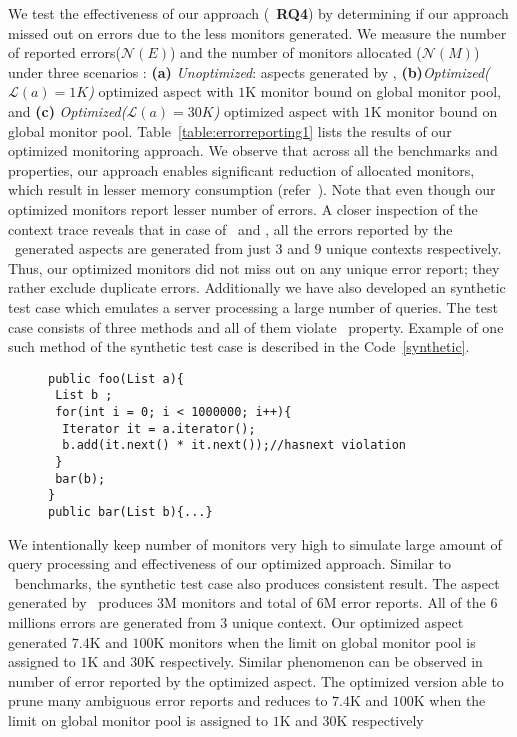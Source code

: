 We test the effectiveness of our approach (\ie\ \textbf{RQ4}) by determining 
if our approach missed out on errors due to the less monitors generated. We 
measure the number of reported errors($\mathcal{N}(E)$) and the number of 
monitors allocated ($\mathcal{N}(M)$) under three scenarios : \textbf{(a)}
\emph{Unoptimized}: aspects generated by \javamop, 
\textbf{(b)}\emph{Optimized($\mathcal{L}(a) = 1K$)} optimized aspect with $1$K 
monitor bound on global monitor pool, and \textbf{(c)} 
\emph{Optimized($\mathcal{L}(a) = 30K$)} optimized aspect with $1$K monitor
bound on global monitor pool. Table~\ref{table:errorreporting1} lists the 
results of our optimized monitoring approach. We observe that across all the 
benchmarks and properties, our approach enables significant reduction of 
allocated monitors, which result in lesser memory consumption 
(refer~). Note that even though our optimized 
monitors report lesser number of errors. A closer inspection of the context 
trace reveals that in case of \bloat\ and \avrora, all the errors
reported by the \javamop\ generated aspects are generated from just $3$ and $9$ 
unique contexts respectively. Thus, our optimized monitors did not miss out on 
any unique error report; they rather exclude duplicate errors. Additionally we
have also developed an synthetic test case which emulates a server processing a
large number of queries. The test case consists of three methods and all of them
violate \hasnext\ property. Example of one such method of the synthetic test
case is described in the Code~\ref{synthetic}.

\begin{figure}[h]
\begin{lstlisting}
public foo(List a){
 List b ;
 for(int i = 0; i < 1000000; i++){
  Iterator it = a.iterator();
  b.add(it.next() * it.next());//hasnext violation
 }
 bar(b);
}
public bar(List b){...}
\end{lstlisting}
\end{figure}

We intentionally keep number of monitors very high
to simulate large amount of query processing and effectiveness of our optimized
approach. Similar to \dacapo\ benchmarks, the synthetic test case also produces
consistent result. The aspect generated by \javamop\ produces $3$M monitors and
total of $6$M error reports. All of the $6$ millions errors are generated from
$3$ unique context. Our optimized aspect generated $7.4$K and $100$K monitors
when the limit on global monitor pool is assigned to $1$K and $30$K respectively.
Similar phenomenon can be observed in number of error reported by the optimized
aspect. The optimized version able to prune many ambiguous error reports and
reduces to $7.4$K and $100$K when the limit on global monitor pool is assigned to
$1$K and $30$K respectively

